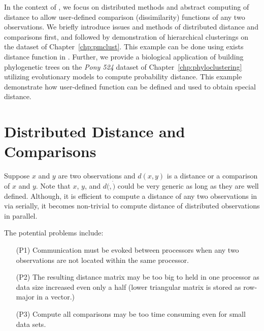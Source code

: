 In the context of \pbdR,
we focus on distributed methods and abstract
computing of distance to allow user-defined comparison (dissimilarity)
functions of any two observations.
We briefly introduce issues and methods of distributed distance and
comparisons first,
and followed by demonstration of hierarchical clusterings on the
dataset of Chapter~\ref{chp:pmclust}. This example can be done using
exists distance function in . Further, we provide a biological
application of building phylogenetic trees on the
{\it Pony 524} dataset
of Chapter~\ref{chp:phyloclustering} utilizing
evolutionary models to compute probability distance.
This example demonstrate how user-defined function can be defined and used
to obtain special distance.



\section{Distributed Distance and Comparisons}

Suppose $x$ and $y$ are two observations and $d(x, y)$ is a distance or
a comparison of $x$ and $y$.
Note that $x$, $y$, and $d(\dot, \dot)$ could be very generic as long as
they are well defined.
Although, it is efficient to compute a distance of any two observations
in  via 
serially, it becomes non-trivial to
compute distance of distributed observations in parallel.

The potential problems include:
\begin{itemize}
\item[(P1)]
      Communication must be evoked between processors when any two observations
      are not located within the same processor.
\item[(P2)]
      The resulting distance matrix may be too big
      to held in one processor as data size increased even only a half (lower
      triangular matrix is stored as row-major in a vector.)
\item[(P3)]
      Compute all comparisons may be too time consuming even for small data
      sets. 
\end{itemize}


